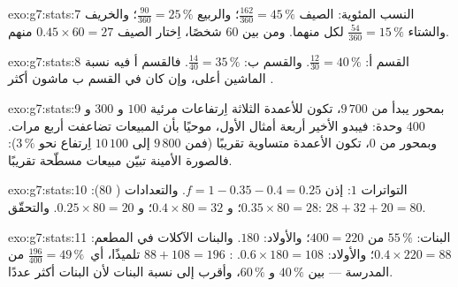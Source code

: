 \begin{solution}{exo:g7:stats:7}
النسب المئوية: الصيف $\frac{162}{360} = 45\,\%$؛ والربيع
$\frac{90}{360} = 25\,\%$؛ والخريف والشتاء
$\frac{54}{360} = 15\,\%$ لكل منهما. ومن بين $60$ شخصًا، اِختار الصيف
$0.45 \times 60 = 27$ منهم.
\end{solution}

\begin{solution}{exo:g7:stats:8}
القسم أ: $\frac{12}{30} = 40\,\%$. والقسم ب: $\frac{14}{40} = 35\,\%$.
فالقسم أ فيه نسبة الماشين أعلى، وإن كان في القسم ب
ماشون أكثر .
\end{solution}

\begin{solution}{exo:g7:stats:9}
بمحور يبدأ من $9\,700$، تكون للأعمدة الثلاثة اِرتفاعات
مرئية $100$ و $300$ و $400$ وحدة: فيبدو الأخير أربعة أمثال
الأول، موحيًا بأن المبيعات تضاعفت أربع مرات. وبمحور من $0$، تكون الأعمدة
متساوية تقريبًا (فمن $9\,800$ إلى $10\,100$ اِرتفاع نحو $3\,\%$):
فالصورة الأمينة تبيّن مبيعات مسطّحة تقريبًا.
\end{solution}

\begin{solution}{exo:g7:stats:10}
 التواترات $1$: إذن $f = 1 - 0.35 - 0.4 = 0.25$. والتعدادات (
$80$): $0.35 \times 80 = 28$؛ و $0.4 \times 80 = 32$؛
و $0.25 \times 80 = 20$. والتحقّق: $28 + 32 + 20 = 80$.
\end{solution}

\begin{solution}{exo:g7:stats:11}
البنات: $55\,\%$ من $400 = 220$؛ والأولاد: $180$. والبنات الآكلات في المطعم:
$0.4 \times 220 = 88$؛ والأولاد: $0.6 \times 180 = 108$. :
$88 + 108 = 196$ تلميذًا، أي\ $\frac{196}{400} = 49\,\%$ من
المدرسة --- بين $40\,\%$ و $60\,\%$، وأقرب إلى نسبة البنات
لأن البنات أكثر عددًا.
\end{solution}

